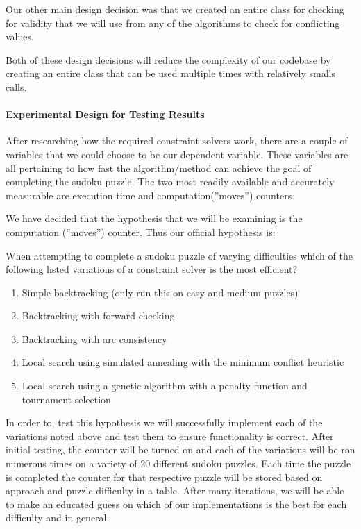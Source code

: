 \documentclass{article}
\begin{document}
Our other main design decision was that we created an entire class for checking for validity that we 
will use from any of the algorithms to check for conflicting values. 

Both of these design decisions will reduce the complexity of our codebase by creating an entire class that 
can be used multiple times with relatively smalls calls.



\paragraph{Experimental Design for Testing Results}
After researching how the required constraint solvers work, there are a couple of variables that we 
could choose to be our dependent variable. These variables are all pertaining to how fast the 
algorithm/method can achieve the goal of completing the sudoku puzzle. The two most readily available 
and accurately measurable are execution time and computation(”moves”) counters. 

We have decided that the hypothesis that we will be examining is the computation (”moves”) counter. 
Thus our official hypothesis is:

When attempting to complete a sudoku puzzle of varying difficulties which of the following 
listed variations of a constraint solver is the most efficient?

\begin{enumerate}
    \item Simple backtracking (only run this on easy and medium puzzles)
    \item Backtracking with forward checking 
    \item Backtracking with arc consistency 
    \item Local search using simulated annealing with the minimum conflict heuristic 
    \item Local search using a genetic algorithm with a penalty function and tournament selection
\end{enumerate}

In order to, test this hypothesis we will successfully implement each of the variations noted above and 
test them to ensure functionality is correct. After initial testing, the counter will be turned on and each of 
the variations will be ran numerous times on a variety of 20 different sudoku puzzles. Each time the puzzle is completed 
the counter for that respective puzzle will be stored based on approach and puzzle difficulty in a table. After many iterations, 
we will be able to make an educated guess on which of our implementations is the best for each difficulty and in general.
\end{document}
